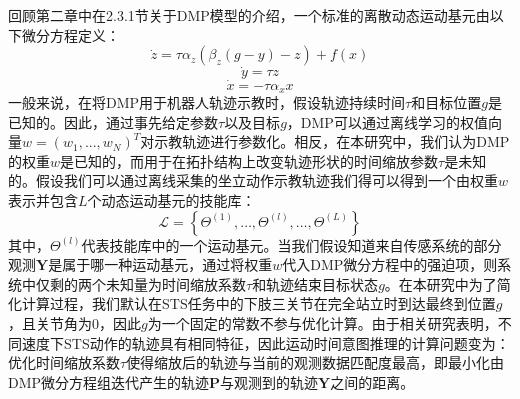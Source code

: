 回顾第二章中在2.3.1节关于DMP模型的介绍，一个标准的离散动态运动基元由以下微分方程定义：
\begin{equation}
    \dot{z}=\tau \alpha_z\left(\beta_z(g-y)-z\right)+f(x)
    \label{eq:4-7}
\end{equation}
\begin{equation}
    \dot{y}=\tau z 
    \label{eq:4-8}
\end{equation}
\begin{equation}
    \dot{x}=-\tau \alpha_x x
    \label{eq:4-9}
\end{equation}
一般来说，在将DMP用于机器人轨迹示教时，假设轨迹持续时间$τ$和目标位置$g$是已知的。因此，通过事先给定参数$τ$以及目标$g$，DMP可以通过离线学习的权值向量$w=(w_1,...,w_N)^T$对示教轨迹进行参数化。相反，在本研究中，我们认为DMP的权重$w$是已知的，而用于在拓扑结构上改变轨迹形状的时间缩放参数$\tau$是未知的。假设我们可以通过离线采集的坐立动作示教轨迹我们得可以得到一个由权重$w$表示并包含$L$个动态运动基元的技能库：
\begin{equation}
    \mathscr{L}=\left\{\Theta^{(1)}, \ldots, \Theta^{(l)}, \ldots, \Theta^{(L)}\right\}
    \label{eq:4-10}
\end{equation}
其中，$\Theta^{(l)}$代表技能库中的一个运动基元。当我们假设知道来自传感系统的部分观测$\mathbf{Y}$是属于哪一种运动基元，通过将权重$w$代入DMP微分方程中的强迫项，则系统中仅剩的两个未知量为时间缩放系数$\tau$和轨迹结束目标状态$g$。在本研究中为了简化计算过程，我们默认在STS任务中的下肢三关节在完全站立时到达最终到位置$g$，且关节角为0，因此$g$为一个固定的常数不参与优化计算。由于相关研究表明，不同速度下STS动作的轨迹具有相同特征，因此运动时间意图推理的计算问题变为：优化时间缩放系数$\tau$使得缩放后的轨迹与当前的观测数据匹配度最高，即最小化由DMP微分方程组迭代产生的轨迹$\mathbf{P}$与观测到的轨迹$\mathbf{Y}$之间的距离。

